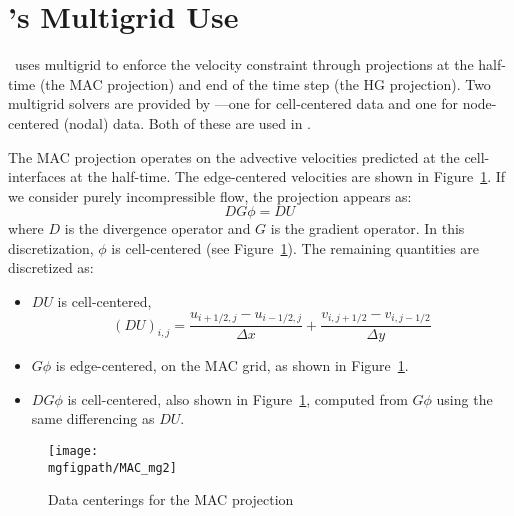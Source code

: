 \section{\maestro's Multigrid Use}

\maestro\ uses multigrid to enforce the velocity constraint through
projections at the half-time (the MAC projection) and end of the time
step (the HG projection).  Two multigrid solvers are provided by
\amrex---one for cell-centered data and one for node-centered (nodal)
data.  Both of these are used in \maestro.


The MAC projection operates on the advective velocities predicted at
the cell-interfaces at the half-time.  The edge-centered velocities
are shown in Figure~\ref{fig:mg:MAC}.  If we consider purely
incompressible flow, the projection appears as:
\begin{equation}
D G \phi = D U
\end{equation}
where $D$ is the divergence operator and $G$ is the gradient operator.
In this discretization, $\phi$ is cell-centered (see
Figure~\ref{fig:mg:MAC}).  The remaining quantities are discretized as:
\begin{itemize}
\item $DU$ is cell-centered, 
  \begin{equation}
  (DU)_{i,j} = \frac{u_{i+1/2,j} - u_{i-1/2,j}}{\Delta x} + 
               \frac{v_{i,j+1/2} - v_{i,j-1/2}}{\Delta y}
  \end{equation}

\item $G\phi$ is edge-centered, on the MAC grid, as shown in
  Figure~\ref{fig:mg:MAC}.

\item $DG\phi$ is cell-centered, also shown in Figure~\ref{fig:mg:MAC},
  computed from $G\phi$ using the same differencing as $DU$.

\end{itemize}

\begin{figure}[t]
\centering
\texttt{[image: \\mgfigpath/MAC\_mg2]}
\caption{\label{fig:mg:MAC} Data centerings for the MAC projection}
\end{figure}

